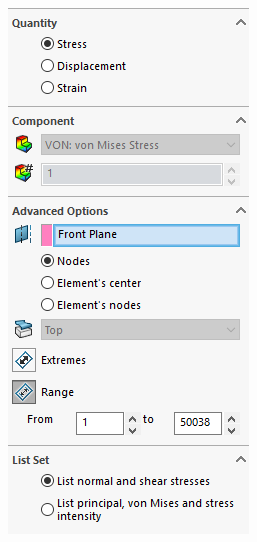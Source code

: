 \documentclass[12pt, letterpaper]{article}
\begin{document}
\begin{figure}[H]
\begin{subfigure}[b]{.3\linewidth}
		\includegraphics[width=\linewidth]{./procedure/stress-list}

\end{subfigure}
\end{figure}
\end{document}
